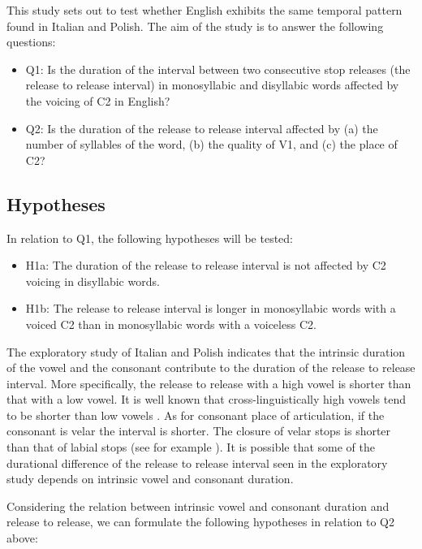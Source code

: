 \documentclass[11pt,]{article}
\providecommand{\tightlist}{%
  \setlength{\itemsep}{0pt}\setlength{\parskip}{0pt}}
\begin{document}
This study sets out to test whether English exhibits the same temporal
pattern found in Italian and Polish. The aim of the study is to answer
the following questions:

\begin{itemize}
\tightlist
\item
  Q1: Is the duration of the interval between two consecutive stop
  releases (the release to release interval) in monosyllabic and
  disyllabic words affected by the voicing of C2 in English?
\item
  Q2: Is the duration of the release to release interval affected by (a)
  the number of syllables of the word, (b) the quality of V1, and (c)
  the place of C2?
\end{itemize}

\hypertarget{hypotheses}{%
\subsection{Hypotheses}\label{hypotheses}}

In relation to Q1, the following hypotheses will be tested:

\begin{itemize}
\tightlist
\item
  H1a: The duration of the release to release interval is not affected
  by C2 voicing in disyllabic words.
\item
  H1b: The release to release interval is longer in monosyllabic words
  with a voiced C2 than in monosyllabic words with a voiceless C2.
\end{itemize}

The exploratory study of Italian and Polish indicates that the intrinsic
duration of the vowel and the consonant contribute to the duration of
the release to release interval. More specifically, the release to
release with a high vowel is shorter than that with a low vowel. It is
well known that cross-linguistically high vowels tend to be shorter than
low vowels
\citep{hertrich1997, esposito2002, mortensen2013, toivonen2015, kawahara2017}.
As for consonant place of articulation, if the consonant is velar the
interval is shorter. The closure of velar stops is shorter than that of
labial stops (see for example \citealt{sharf1962}). It is possible that
some of the durational difference of the release to release interval
seen in the exploratory study depends on intrinsic vowel and consonant
duration.

Considering the relation between intrinsic vowel and consonant duration
and release to release, we can formulate the following hypotheses in
relation to Q2 above:
\end{document}
